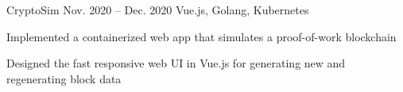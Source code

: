 \fontdir[fonts/]

\begin{cvprojects}


  \cvproject
  {CryptoSim}
  {\href{https://github.com/jzlotek/bc}{\faGithubSquare\acvHeaderIconSep\@KevinIsMyName}}
  {Nov. 2020 -- Dec. 2020}
  {Vue.js, Golang, Kubernetes}
  {
    \begin{cvitems}
      \item Implemented a containerized web app that simulates a proof-of-work blockchain
      \item Designed the fast responsive web UI in Vue.js for generating new and regenerating block data
    \end{cvitems}
  }





\end{cvprojects}
